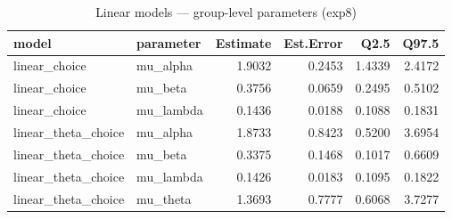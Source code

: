 \begin{table}

\caption{Linear models — group-level parameters (exp8)}
\centering
\begin{tabular}[t]{llrrrr}
\toprule
model & parameter & Estimate & Est.Error & Q2.5 & Q97.5\\
\midrule
linear\_choice & mu\_alpha & 1.9032 & 0.2453 & 1.4339 & 2.4172\\
linear\_choice & mu\_beta & 0.3756 & 0.0659 & 0.2495 & 0.5102\\
linear\_choice & mu\_lambda & 0.1436 & 0.0188 & 0.1088 & 0.1831\\
linear\_theta\_choice & mu\_alpha & 1.8733 & 0.8423 & 0.5200 & 3.6954\\
linear\_theta\_choice & mu\_beta & 0.3375 & 0.1468 & 0.1017 & 0.6609\\
\addlinespace
linear\_theta\_choice & mu\_lambda & 0.1426 & 0.0183 & 0.1095 & 0.1822\\
linear\_theta\_choice & mu\_theta & 1.3693 & 0.7777 & 0.6068 & 3.7277\\
\bottomrule
\end{tabular}
\end{table}

